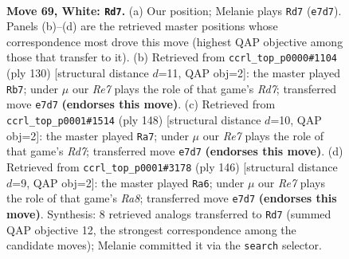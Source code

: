 \documentclass[11pt]{article}
\begin{document}
\clearpage

\begin{figure}[p]\centering
\begin{subfigure}{0.46\textwidth}\centering
\resizebox{\linewidth}{!}{%
\newchessgame
\chessboard[
  setfen={5rk1/P3R3/8/8/7K/8/8/8 w - - 7 69},
  showmover=false,
  pgfstyle=straightmove, color=movearrow, markmove={e7-d7}
]}
\caption{}
\end{subfigure}\hfill
\begin{subfigure}{0.46\textwidth}\centering
\resizebox{\linewidth}{!}{%
\newchessgame
\chessboard[
  setfen={5rk1/3R4/1p4K1/6P1/8/8/8/8 w - - 1 66},
  showmover=false,
  pgfstyle=straightmove, color=movearrow, markmove={d7-b7}
]}
\caption{}
\end{subfigure}
\\[4pt]
\begin{subfigure}{0.46\textwidth}\centering
\resizebox{\linewidth}{!}{%
\newchessgame
\chessboard[
  setfen={8/3R4/8/6pP/4kr2/8/8/3K4 w - - 16 75},
  showmover=false,
  pgfstyle=straightmove, color=movearrow, markmove={d7-a7}
]}
\caption{}
\end{subfigure}\hfill
\begin{subfigure}{0.46\textwidth}\centering
\resizebox{\linewidth}{!}{%
\newchessgame
\chessboard[
  setfen={R7/4rk2/8/5PK1/8/5P2/8/8 w - - 17 74},
  showmover=false,
  pgfstyle=straightmove, color=movearrow, markmove={a8-a6}
]}
\caption{}
\end{subfigure}
\caption{\textbf{Move 69, White: \texttt{Rd7}.} (a) Our position; Melanie plays \texttt{Rd7} (\texttt{e7d7}). Panels (b)--(d) are the retrieved master positions whose correspondence most drove this move (highest QAP objective among those that transfer to it). (b) Retrieved from \texttt{ccrl\_top\_p0000\#1104} (ply 130) [structural distance $d$=11, QAP obj=2]: the master played \texttt{Rb7}; under $\mu$ our \emph{Re7} plays the role of that game's \emph{Rd7}; transferred move \texttt{e7d7} \textbf{(endorses this move)}. (c) Retrieved from \texttt{ccrl\_top\_p0001\#1514} (ply 148) [structural distance $d$=10, QAP obj=2]: the master played \texttt{Ra7}; under $\mu$ our \emph{Re7} plays the role of that game's \emph{Rd7}; transferred move \texttt{e7d7} \textbf{(endorses this move)}. (d) Retrieved from \texttt{ccrl\_top\_p0001\#3178} (ply 146) [structural distance $d$=9, QAP obj=2]: the master played \texttt{Ra6}; under $\mu$ our \emph{Re7} plays the role of that game's \emph{Ra8}; transferred move \texttt{e7d7} \textbf{(endorses this move)}. Synthesis: 8 retrieved analogs transferred to \texttt{Rd7} (summed QAP objective 12, the strongest correspondence among the candidate moves); Melanie committed it via the \texttt{search} selector.}
\label{fig:thought-m136}
\end{figure}
\end{document}
